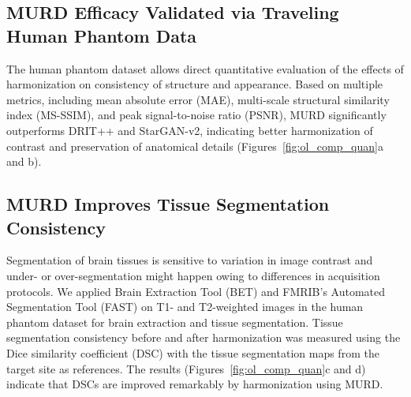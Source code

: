 \documentclass{nature}
\begin{document}
\subsection{MURD Efficacy Validated via Traveling Human Phantom Data}
The human phantom dataset allows direct quantitative evaluation of the effects of harmonization on consistency of structure and appearance.
Based on multiple metrics, including mean absolute error (MAE), multi-scale structural similarity index (MS-SSIM), and peak signal-to-noise ratio (PSNR), MURD significantly outperforms DRIT++ and StarGAN-v2, indicating better harmonization of contrast and preservation of anatomical details (Figures~\ref{fig:ol_comp_quan}a and b). 

\subsection{MURD Improves Tissue Segmentation Consistency}
Segmentation of brain tissues is sensitive to variation in image contrast and under- or over-segmentation might happen owing to differences in acquisition protocols.
We applied Brain Extraction Tool (BET)\cite{Smith2002Fast} and FMRIB's Automated Segmentation Tool (FAST)\cite{Zhang2001Segmentation} on T1- and T2-weighted images in the human phantom dataset for brain extraction and tissue segmentation.
Tissue segmentation consistency before and after harmonization was measured using the Dice similarity coefficient (DSC) with the tissue segmentation maps from the target site as references. The results (Figures~\ref{fig:ol_comp_quan}c and d) indicate that DSCs are improved remarkably by harmonization using MURD.
\end{document}
